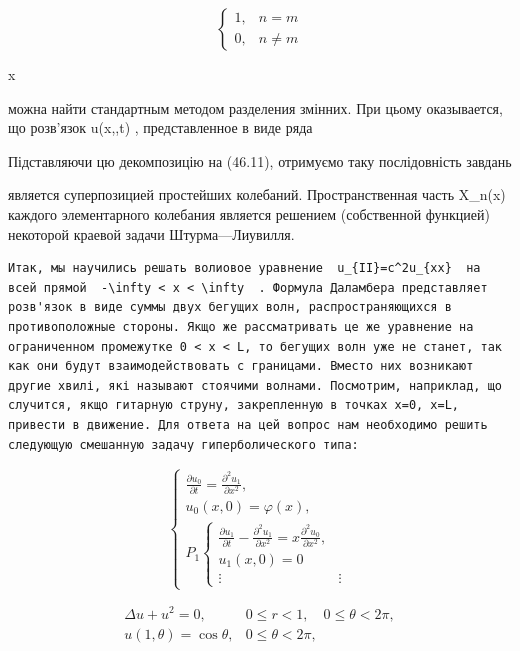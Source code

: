 \documentclass[
  ukrainian,
]{article}
\begin{document}
\[
\begin{cases} 1, & n=m \\ 0, & n\neq m \end{cases}
\]

x

можна найти стандартным методом разделения змінних. При цьому
оказывается, що розв'язок u\left(x,,t\right) , представленное в виде
ряда

Підставляючи цю декомпозицію на (46.11), отримуємо таку послідовність
завдань

является суперпозицией простейших колебаний. Пространственная часть
X\_n(x) каждого элементарного колебания является решением (собственной
функцией) некоторой краевой задачи Штурма---Лиувилля.

\begin{verbatim}
Итак, мы научились решать волиовое уравнение  u_{II}=c^2u_{xx}  на всей прямой  -\infty < x < \infty  . Формула Даламбера представляет розв'язок в виде суммы двух бегущих волн, распространяющихся в противоположные стороны. Якщо же рассматривать це же уравнение на ограниченном промежутке 0 < x < L, то бегущих волн уже не станет, так как они будут взаимодействовать с границами. Вместо них возникают другие хвилі, які называют стоячими волнами. Посмотрим, наприклад, що случится, якщо гитарную струну, закрепленную в точках x=0, x=L, привести в движение. Для ответа на цей вопрос нам необходимо решить следующую смешанную задачу гиперболического типа:
\end{verbatim}

\[
\begin{cases} \frac{\partial u_{0}}{\partial t} = \frac{\partial^{2} u_{1}}{\partial x^{2}}, \\ u_{0}(x, 0) = \varphi(x), \\ P_{1} \begin{cases} \frac{\partial u_{1}}{\partial t} - \frac{\partial^{2} u_{1}}{\partial x^{2}} = x \frac{\partial^{2} u_{0}}{\partial x^{2}}, \\ u_{1}(x, 0) = 0 \\ \vdots & \vdots \end{cases} \end{cases}
\]

\[
\begin{aligned} \Delta u + u^2 = 0, & 0 \leqslant r < 1, \quad 0 \leqslant \theta < 2\pi, \\ u(1, \theta) = \cos \theta, & 0 \leqslant \theta < 2\pi, \end{aligned}
\]
\end{document}

